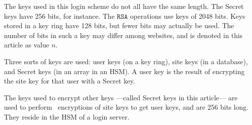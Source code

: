 %
%
%
The keys used in this login scheme do not all have the same length.
The Secret keys have 256 bits, for instance.
The $\mathtt{RSA}$ operations use keys of 2048 bits.
Keys stored in a key ring have 128 bits,
but fewer bits may actually be used.
The number of bits in such a key may differ among websites,
and is denoted in this article as value $n$.
\par
Three sorts of keys are used:
user keys
(on a key ring),
site keys
(in a database),
and Secret keys
(in an array in an HSM).
A user key is the result of encrypting the site key for that user with a Secret key.

\label{sec:secret_keys}
The keys used to encrypt other keys%
---called Secret keys in this article---%
are used to perform \AES\ encryptions of site keys to get user keys,
and are 256 bits long.
They reside in the HSM of a login server.
